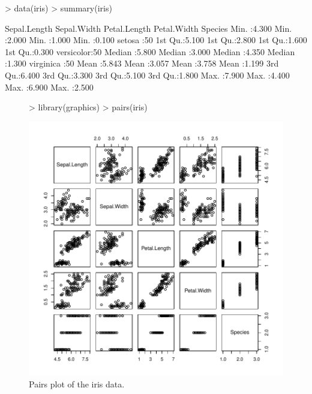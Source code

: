 \documentclass[a4paper]{article}
\begin{document}
\begin{Schunk}
\begin{Sinput}
> data(iris)
> summary(iris)
\end{Sinput}
\begin{Soutput}
  Sepal.Length    Sepal.Width     Petal.Length    Petal.Width          Species  
 Min.   :4.300   Min.   :2.000   Min.   :1.000   Min.   :0.100   setosa    :50  
 1st Qu.:5.100   1st Qu.:2.800   1st Qu.:1.600   1st Qu.:0.300   versicolor:50  
 Median :5.800   Median :3.000   Median :4.350   Median :1.300   virginica :50  
 Mean   :5.843   Mean   :3.057   Mean   :3.758   Mean   :1.199                  
 3rd Qu.:6.400   3rd Qu.:3.300   3rd Qu.:5.100   3rd Qu.:1.800                  
 Max.   :7.900   Max.   :4.400   Max.   :6.900   Max.   :2.500                  
\end{Soutput}
\end{Schunk}


\begin{figure}[htbp]
  \begin{center}
\begin{Schunk}
\begin{Sinput}
> library(graphics)
> pairs(iris)
\end{Sinput}
\end{Schunk}
\includegraphics{Sweave-test-1-006}
     \caption{Pairs plot of the iris data.}
  \end{center}
\end{figure}
\end{document}
